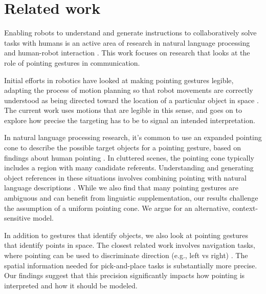 \section{Related work}
\label{related-work}
Enabling robots to understand and generate instructions to collaboratively solve tasks with humans is an active area of research in natural language processing and human-robot interaction \cite{cha2018survey,butepage2017human}.   This work focuses on research that looks at the role of pointing gestures in communication.

Initial efforts in robotics have looked at making pointing gestures legible, adapting the process of motion planning so that robot movements are correctly understood as being directed toward the location of a particular object in space \cite{holladay2014legible,zhao2016experimental}.  The current work uses motions that are legible in this sense, and goes on to explore how precise the targeting has to be to signal an intended interpretation.

In natural language processing research, it's common to use an expanded pointing cone to describe the possible target objects for a pointing gesture, based on findings about human pointing \cite{kranstedt2003deixis,rieser2004pointing}.  In cluttered scenes, the pointing cone typically includes a region with many candidate referents.  Understanding and generating object references in these situations involves combining pointing with natural language descriptions \cite{han2018placing,kollar2014grounding}.  While we also find that many pointing gestures are ambiguous and can benefit from linguistic supplementation, our results challenge the assumption of a uniform pointing cone. We argue for an alternative, context-sensitive model.

In addition to gestures that identify objects, we also look at pointing gestures that identify points in space.  The closest related work involves navigation tasks, where pointing can be used to discriminate direction (e.g., left vs right) \cite{mei2016listen,tellex2011understanding}.  The spatial information needed for pick-and-place tasks is substantially more precise. Our findings suggest that this precision significantly impacts how pointing is interpreted and how it should be modeled.



